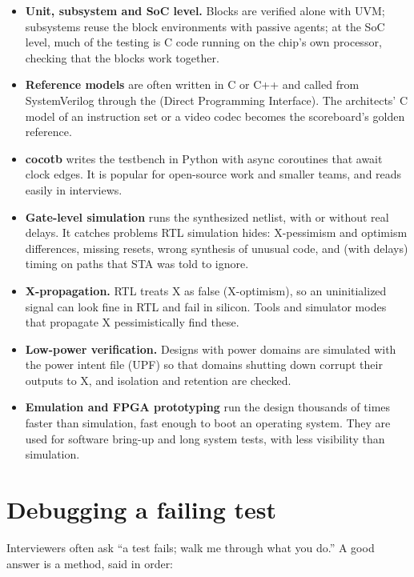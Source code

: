 \begin{itemize}
  \item \textbf{Unit, subsystem and SoC level.} Blocks are verified alone with UVM; subsystems reuse the block environments with passive agents; at the SoC level, much of the testing is C code running on the chip's own processor, checking that the blocks work together.
  \item \textbf{Reference models} are often written in C or C++ and called from SystemVerilog through the  (Direct Programming Interface). The architects' C model of an instruction set or a video codec becomes the scoreboard's golden reference.
  \item \textbf{cocotb} writes the testbench in Python with async coroutines that await clock edges. It is popular for open-source work and smaller teams, and reads easily in interviews.
  \item \textbf{Gate-level simulation} runs the synthesized netlist, with or without real delays. It catches problems RTL simulation hides: X-pessimism and optimism differences, missing resets, wrong synthesis of unusual code, and (with delays) timing on paths that STA was told to ignore.
  \item \textbf{X-propagation.} RTL  treats X as false (X-optimism), so an uninitialized signal can look fine in RTL and fail in silicon. Tools and simulator modes that propagate X pessimistically find these.
  \item \textbf{Low-power verification.} Designs with power domains are simulated with the power intent file (UPF) so that domains shutting down corrupt their outputs to X, and isolation and retention are checked.
  \item \textbf{Emulation and FPGA prototyping} run the design thousands of times faster than simulation, fast enough to boot an operating system. They are used for software bring-up and long system tests, with less visibility than simulation.
\end{itemize}

\section{Debugging a failing test}

Interviewers often ask ``a test fails; walk me through what you do.'' A good answer is a method, said in order:

